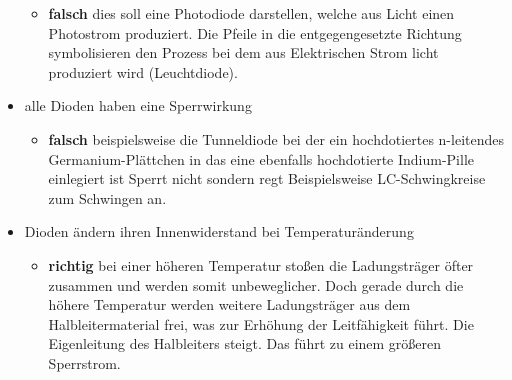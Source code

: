 \begin{itemize}
\begin{itemize}
            \item \textbf{falsch} dies soll eine Photodiode darstellen, welche
                aus Licht einen Photostrom produziert. 
                Die Pfeile in die entgegengesetzte Richtung symbolisieren den
                Prozess bei dem aus Elektrischen Strom licht produziert
                wird (Leuchtdiode).
        \end{itemize}
    \item alle Dioden haben eine Sperrwirkung
        \begin{itemize}
            \item \textbf{falsch} beispielsweise die Tunneldiode bei der ein
                hochdotiertes n-leitendes Germanium-Plättchen in das eine 
                ebenfalls hochdotierte Indium-Pille einlegiert ist Sperrt 
                nicht sondern regt Beispielsweise LC-Schwingkreise zum 
                Schwingen an.
        \end{itemize}
    \item Dioden ändern ihren Innenwiderstand bei Temperaturänderung
    \begin{itemize}
        \item \textbf{richtig} bei einer höheren Temperatur stoßen die 
            Ladungsträger öfter zusammen und werden somit unbeweglicher. 
            Doch gerade durch die höhere Temperatur werden weitere 
            Ladungsträger aus dem Halbleitermaterial frei, 
            was zur Erhöhung der Leitfähigkeit führt. 
            Die Eigenleitung des Halbleiters steigt. 
            Das führt zu einem größeren Sperrstrom.
    \end{itemize}
\end{itemize}
